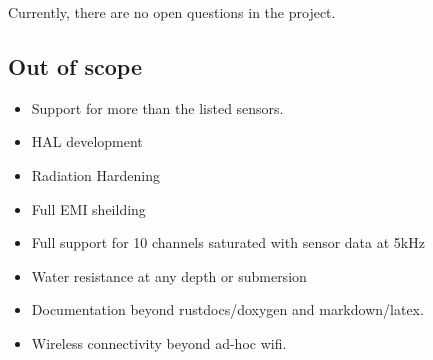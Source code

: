 Currently, there are no open questions in the project.

\hypertarget{out-of-scope}{%
\subsection{Out of scope}\label{out-of-scope}}

\begin{itemize}
\tightlist
\item
  Support for more than the listed sensors.
\item
  HAL development
\item
  Radiation Hardening
\item
  Full EMI sheilding
\item
  Full support for 10 channels saturated with sensor data at 5kHz
\item
  Water resistance at any depth or submersion
\item
  Documentation beyond rustdocs/doxygen and markdown/latex.
\item
  Wireless connectivity beyond ad-hoc wifi.
\end{itemize}
